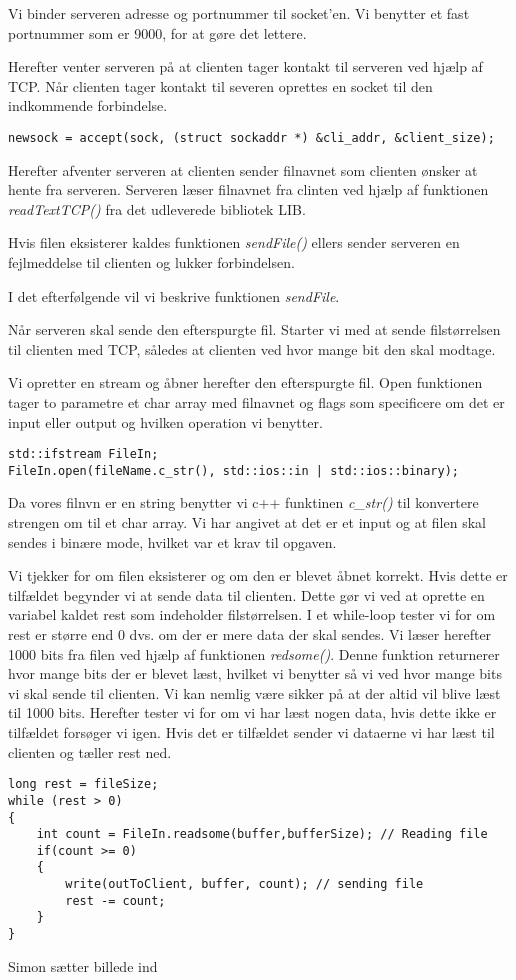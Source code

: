 Vi binder serveren adresse og portnummer til socket'en. Vi benytter et fast portnummer som er 9000, for at gøre det lettere. 

Herefter venter serveren på at clienten tager kontakt til serveren ved hjælp af TCP. Når clienten tager kontakt til severen oprettes en socket til den indkommende forbindelse. 

\begin{lstlisting}
newsock = accept(sock, (struct sockaddr *) &cli_addr, &client_size);
\end{lstlisting}

Herefter afventer serveren at clienten sender filnavnet som clienten ønsker at hente fra serveren. Serveren læser filnavnet fra clinten ved hjælp af funktionen \textit{readTextTCP()} fra det udleverede bibliotek LIB. 

Hvis filen eksisterer kaldes funktionen \textit{sendFile()} ellers sender serveren en fejlmeddelse til clienten og lukker forbindelsen. 

I det efterfølgende vil vi beskrive funktionen \textit{sendFile}. 

Når serveren skal sende den efterspurgte fil. Starter vi med at sende filstørrelsen til clienten med TCP, således at clienten ved hvor mange bit den skal modtage. 

Vi opretter en stream og åbner herefter den efterspurgte fil. Open funktionen tager to parametre et char array med filnavnet og flags som specificere om det er input eller output og hvilken operation vi benytter. 

\begin{lstlisting}
std::ifstream FileIn; 
FileIn.open(fileName.c_str(), std::ios::in | std::ios::binary);
\end{lstlisting}

Da vores filnvn er en string benytter vi c++ funktinen \textit{c\_str()} til konvertere strengen om til et char array. Vi har angivet at det er et input og at filen skal sendes i binære mode, hvilket var et krav til opgaven. 

Vi tjekker for om filen eksisterer og om den er blevet åbnet korrekt.
Hvis dette er tilfældet begynder vi at sende data til clienten. Dette gør vi ved at oprette en variabel kaldet rest som indeholder filstørrelsen. 
I et while-loop tester vi for om rest er større end 0 dvs. om der er mere data der skal sendes. 
Vi læser herefter 1000 bits fra filen ved hjælp af funktionen \textit{redsome()}. Denne funktion returnerer hvor mange bits der er blevet læst, hvilket vi benytter så vi ved hvor mange bits vi skal sende til clienten. Vi kan nemlig være sikker på at der altid vil blive læst til 1000 bits. 
Herefter tester vi for om vi har læst nogen data, hvis dette ikke er tilfældet forsøger vi igen. Hvis det er tilfældet sender vi dataerne vi har læst til clienten og tæller rest ned. 

\begin{lstlisting}
long rest = fileSize;
while (rest > 0)
{
	int count = FileIn.readsome(buffer,bufferSize); // Reading file 
	if(count >= 0)
	{
		write(outToClient, buffer, count); // sending file
		rest -= count;
	}
}
\end{lstlisting}

Simon sætter billede ind


